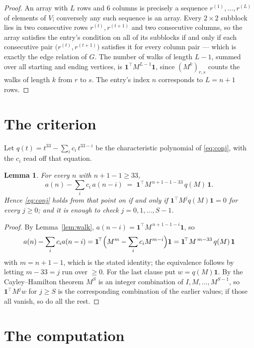 \documentclass[11pt,a4paper]{article}
\theoremstyle{plain}
\newtheorem{lemma}[theorem]{Lemma}
\theoremstyle{definition}
\begin{document}
\begin{proof}
An array with $L$ rows and $6$ columns is precisely a sequence
$r^{(1)},\dots,r^{(L)}$ of elements of $V$; conversely any such sequence is an array.
Every $2\times2$ subblock lies in two consecutive rows $r^{(t)},r^{(t+1)}$ and two
consecutive columns, so the array satisfies the entry's condition on all of its subblocks
if and only if each consecutive pair $\bigl(r^{(t)},r^{(t+1)}\bigr)$ satisfies it for
every column pair --- which is exactly the edge relation of $G$. The number of walks of
length $L-1$, summed over all starting and ending vertices, is
$\mathbf{1}^{\!\top}M^{L-1}\mathbf{1}$, since $(M^{k})_{r,s}$ counts the walks of
length $k$ from $r$ to $s$. The entry's index $n$ corresponds to $L=n+1$ rows.
\end{proof}

\section{The criterion}

Let $q(t)=t^{33}-\sum_i c_i\,t^{33-i}$ be the characteristic polynomial of
\eqref{eq:conj}, with the $c_i$ read off that equation.

\begin{lemma}\label{lem:crit}
For every $n$ with $n+1-1\ge33$,
\[
a(n)-\sum_i c_i\,a(n-i)\;=\;\mathbf{1}^{\!\top}M^{\,n+1-1-33}\,q(M)\,\mathbf{1} .
\]
Hence \eqref{eq:conj} holds from that point on if and only if
$\mathbf{1}^{\!\top}M^{j}q(M)\mathbf{1}=0$ for every $j\ge0$; and it is enough to check
$j=0,1,\dots,S-1$.
\end{lemma}

\begin{proof}
By Lemma~\ref{lem:walk}, $a(n-i)=\mathbf{1}^{\!\top}M^{\,n+1-1-i}\mathbf{1}$, so
\[
a(n)-\sum_i c_i a(n-i)
=\mathbf{1}^{\!\top}\Bigl(M^{m}-\sum_i c_i M^{m-i}\Bigr)\mathbf{1}
=\mathbf{1}^{\!\top}M^{\,m-33}\,q(M)\,\mathbf{1}
\]
with $m=n+1-1$, which is the stated identity; the equivalence follows by letting
$m-33=j$ run over $\ge0$. For the last clause put $w=q(M)\mathbf{1}$. By the
Cayley--Hamilton theorem $M^{S}$ is an integer combination of $I,M,\dots,M^{S-1}$, so
$\mathbf{1}^{\!\top}M^{j}w$ for $j\ge S$ is the corresponding combination of the earlier
values; if those all vanish, so do all the rest.
\end{proof}

\section{The computation}
\end{document}
